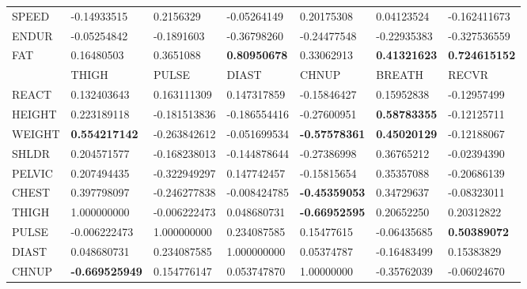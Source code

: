 \documentclass[10pt]{article}
\begin{document}
\begin{table}[H]
\begin{tabular}{lllllll}
SPEED  & -0.14933515           & 0.2156329             & -0.05264149          & 0.20175308           & 0.04123524          & -0.162411673          \\
ENDUR  & -0.05254842           & -0.1891603            & -0.36798260          & -0.24477548          & -0.22935383         & -0.327536559          \\
FAT    & 0.16480503            & 0.3651088             & \textbf{0.80950678}  & 0.33062913           & \textbf{0.41321623} & \textbf{0.724615152}  \\
       & THIGH                 & PULSE                 & DIAST                & CHNUP                & BREATH              & RECVR                 \\
REACT  & 0.132403643           & 0.163111309           & 0.147317859          & -0.15846427          & 0.15952838          & -0.12957499           \\
HEIGHT & 0.223189118           & -0.181513836          & -0.186554416         & -0.27600951          & \textbf{0.58783355} & -0.12125711           \\
WEIGHT & \textbf{0.554217142}  & -0.263842612          & -0.051699534         & \textbf{-0.57578361} & \textbf{0.45020129} & -0.12188067           \\
SHLDR  & 0.204571577           & -0.168238013          & -0.144878644         & -0.27386998          & 0.36765212          & -0.02394390           \\
PELVIC & 0.207494435           & -0.322949297          & 0.147742457          & -0.15815654          & 0.35357088          & -0.20686139           \\
CHEST  & 0.397798097           & -0.246277838          & -0.008424785         & \textbf{-0.45359053} & 0.34729637          & -0.08323011           \\
THIGH  & 1.000000000           & -0.006222473          & 0.048680731          & \textbf{-0.66952595} & 0.20652250          & 0.20312822            \\
PULSE  & -0.006222473          & 1.000000000           & 0.234087585          & 0.15477615           & -0.06435685         & \textbf{0.50389072}   \\
DIAST  & 0.048680731           & 0.234087585           & 1.000000000          & 0.05374787           & -0.16483499         & 0.15383829            \\
CHNUP  & \textbf{-0.669525949} & 0.154776147           & 0.053747870          & 1.00000000           & -0.35762039         & -0.06024670           \\

\end{tabular}
\end{table}
\end{document}

